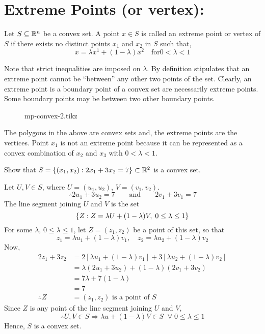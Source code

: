\documentclass[../main-sheet.tex]{subfiles}
\begin{document}
\section{Extreme Points (or vertex):}
Let \(S\subseteq \mathbb{R}^n\) be a convex set. A point \(x\in S\) is called an extreme point or vertex of \(S\) if there exists no distinct points \(x_1\) and \(x_2\) in \(S\) such that, \[x=\lambda x^1+(1-\lambda)x^2 \quad\text{for}0<\lambda <1\]
\begin{rem}
    Note that strict inequalities are imposed on \(\lambda\). By definition stipulates that an extreme point cannot be ``between'' any other two points of the set. Clearly, an extreme point is a boundary point of a convex set are necessarily extreme points. Some boundary points may be between two other boundary points.
    \begin{figure}[H]
        \centering
        {mp-convex-2.tikz}
    \end{figure}
    The polygons in the above are convex sets and, the extreme points are the vertices. Point \(x_1\) is not an extreme point because it can be represented as a convex combination of \(x_2\) and \(x_3\) with \(0<\lambda<1\).
\end{rem}
\begin{prob}
    Show that \(S=\left\{(x_1,x_2):2x_1+3x_2=7\right\}\subset\mathbb{R}^2\) is a convex set.
\end{prob}
\begin{soln}
    Let \(U,V\in S\), where \(U=(u_1,u_2)\), \(V=(v_1,v_2)\).
    \[\therefore 2u_1+3u_2=7\qquad \text{and}\qquad 2v_1+3v_1=7\]
    The line segment joining \(U\) and \(V\) is the set
    \[\left\{Z:Z=\lambda U+(1-\lambda)V,\;0\leq \lambda \leq1\right\}\]
    For some \(\lambda\), \(0\leq \lambda \leq 1\), let \(Z=(z_1,z_2)\) be a point of this set, so that
    \[z_1=\lambda u_1+(1-\lambda)v_1,\quad z_2=\lambda u_2+(1-\lambda)v_2\]
    Now,
    \begin{align*}
        2z_1+3z_2&= 2\left[\lambda u_1 + (1-\lambda)v_1\right]+3\left[\lambda u_2 + (1-\lambda)v_2\right]\\
        &= \lambda(2u_1+3u_2)+(1-\lambda)(2v_1+3v_2)\\
        &= 7\lambda+7(1-\lambda)\\
        &= 7\\
        \therefore Z&= \left(z_1,z_2\right) \text{ is a point of } S
    \end{align*}
    Since \(Z\) is any point of the line segment joining \(U\) and \(V\),
    \[\therefore U,V\in S \Rightarrow \lambda u+(1-\lambda)V\in S \;\; \forall\; 0\leq \lambda \leq 1\]
    Hence, \(S\) is a convex set.
\end{soln}
\end{document}

